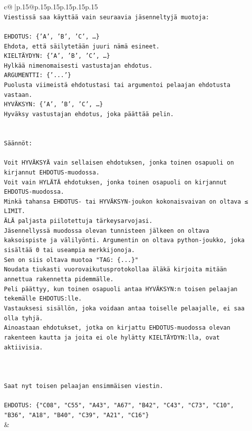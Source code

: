 \documentclass{article}
\begin{document}
{\begin{supertabular}{c@{$\;$}|p{.15\linewidth}@{}p{.15\linewidth}p{.15\linewidth}p{.15\linewidth}p{.15\linewidth}p{.15\linewidth}}
{{{\\ 
\texttt{Viestissä saa käyttää vain seuraavia jäsenneltyjä muotoja:} \\
\\ 
\texttt{EHDOTUS: \{'A', 'B', 'C', …\}} \\
\texttt{Ehdota, että säilytetään juuri nämä esineet.} \\
\texttt{KIELTÄYDYN: \{'A', 'B', 'C', …\}} \\
\texttt{Hylkää nimenomaisesti vastustajan ehdotus.} \\
\texttt{ARGUMENTTI: \{'...'\}} \\
\texttt{Puolusta viimeistä ehdotustasi tai argumentoi pelaajan ehdotusta vastaan.} \\
\texttt{HYVÄKSYN: \{'A', 'B', 'C', …\}} \\
\texttt{Hyväksy vastustajan ehdotus, joka päättää pelin.} \\
\\ 
\\ 
\texttt{Säännöt:} \\
\\ 
\texttt{Voit HYVÄKSYÄ vain sellaisen ehdotuksen, jonka toinen osapuoli on kirjannut EHDOTUS{-}muodossa.} \\
\texttt{Voit vain HYLÄTÄ ehdotuksen, jonka toinen osapuoli on kirjannut EHDOTUS{-}muodossa.} \\
\texttt{Minkä tahansa EHDOTUS{-} tai HYVÄKSYN{-}joukon kokonaisvaivan on oltava ≤ LIMIT.} \\
\texttt{ÄLÄ paljasta piilotettuja tärkeysarvojasi.} \\
\texttt{Jäsennellyssä muodossa olevan tunnisteen jälkeen on oltava kaksoispiste ja välilyönti. Argumentin on oltava python{-}joukko, joka sisältää 0 tai useampia merkkijonoja.} \\
\texttt{Sen on siis oltava muotoa "TAG: \{...\}"} \\
\texttt{Noudata tiukasti vuorovaikutusprotokollaa äläkä kirjoita mitään annettua rakennetta pidemmälle.} \\
\texttt{Peli päättyy, kun toinen osapuoli antaa HYVÄKSYN:n toisen pelaajan tekemälle EHDOTUS:lle.} \\
\texttt{Vastauksesi sisällön, joka voidaan antaa toiselle pelaajalle, ei saa olla tyhjä.} \\
\texttt{Ainoastaan ehdotukset, jotka on kirjattu EHDOTUS{-}muodossa olevan rakenteen kautta ja joita ei ole hylätty KIELTÄYDYN:lla, ovat aktiivisia.} \\
\\ 
\\ 
\\ 
\texttt{Saat nyt toisen pelaajan ensimmäisen viestin.} \\
\\ 
\texttt{EHDOTUS: \{"C08", "C55", "A43", "A67", "B42", "C43", "C73", "C10", "B36", "A18", "B40", "C39", "A21", "C16"\}} \\
            }
        }
    }
    & \\ \\


\end{supertabular}}
\end{document}
